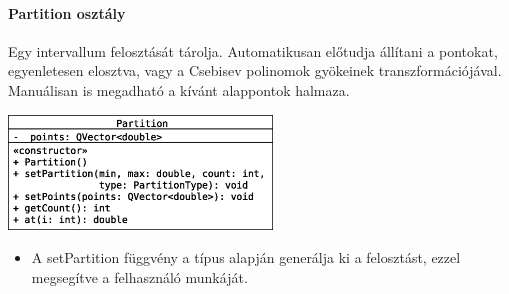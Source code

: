 \documentclass[12pt]{report}
\begin{document}
\paragraph{Partition osztály}
Egy intervallum felosztását tárolja. Automatikusan előtudja állítani a pontokat, egyenletesen elosztva, vagy a Csebisev polinomok gyökeinek transzformációjával. Manuálisan is megadható a kívánt alappontok halmaza.
\begin{center}
\includegraphics[width=7cm]{pics/uml/Partition}
\end{center}
\begin{itemize}
\item A setPartition függvény a típus alapján generálja ki a felosztást, ezzel megsegítve a felhasználó munkáját.
\end{itemize}
\end{document}
